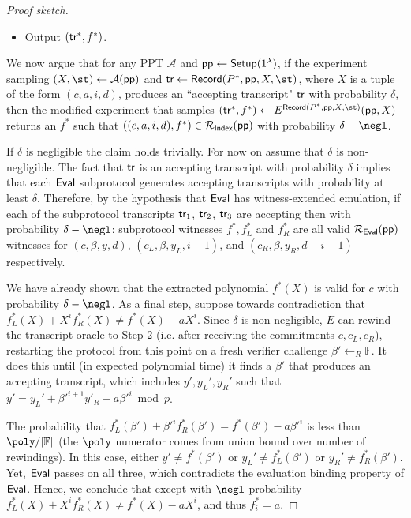 \documentclass{article}
\theoremstyle{definition}
\begin{document}
\begin{proof}[Proof sketch]
\begin{itemize}
\item Output $(\textsf{{tr}}^*, f^*)$.  
\end{itemize}

We now argue that for any PPT $\mathcal{A}$ and $\textsf{pp} \leftarrow \textsf{{Setup}}(1^\lambda)$, if the experiment sampling $(X, \st) \leftarrow \mathcal{A}(\params)$ and $\tr \leftarrow \pro{Record}(P^*, \params, X, \st)$, where $X$ is a tuple of the form $(c, a, i, d)$, produces an ``accepting transcript" $\textsf{{tr}}$ with probability $\delta$, then the modified experiment that samples $(\tr^*, f^*) \leftarrow E^{\textsf{Record}(P^*, \params, X, \st)}(\params, X)$ returns an $f^*$ such that $((c, a, i, d), f^*) \in \mathcal{R_\textsf{Index}}(\textsf{pp})$ with probability $\delta - \negl$. 

If $\delta$ is negligible the claim holds trivially. For now on assume that $\delta$ is non-negligible. 
The fact that $\textsf{{tr}}$ is an accepting transcript with probability $\delta$ implies that each $\textsf{{Eval}}$ subprotocol generates accepting transcripts with probability at least $\delta$. Therefore, by the hypothesis that $\textsf{{Eval}}$ has witness-extended emulation, if each of the subprotocol transcripts $\textsf{{tr}}_1$, $\textsf{{tr}}_2$, $\textsf{{tr}}_3$ are accepting then with probability $\delta - \negl$: subprotocol witnesses $f^*, f_L^*$ and $f_R^*$ are all valid $\mathcal{R_\textsf{Eval}}(\textsf{pp})$ witnesses for $(c, \beta, y, d)$, $(c_L, \beta, y_L, i-1)$, and $(c_R, \beta, y_R, d - i - 1)$ respectively. 

We have already shown that the extracted polynomial $f^*(X)$ is valid for $c$ with probability $\delta - \negl$. As a final step, suppose towards contradiction that $f_L^*(X) + X^i f_R^*(X) \neq f^*(X) - a X^i$. Since $\delta$ is non-negligible, $E$ can rewind the transcript oracle to Step 2 (i.e. after receiving the commitments $c, c_L, c_R$), restarting the protocol from this point on a fresh verifier challenge $\beta' \leftarrow_R \mathbb{F}$. It does this until (in expected polynomial time) it finds a $\beta'$ that produces an accepting transcript, which includes $y', y_L', y_R'$ such that $y' = y_L' + \beta'^{i+1} y'_R - a \beta'^i \bmod p$.

The probability that $f_L^*(\beta') + \beta'^i f_R^*(\beta') = f^*(\beta') - a \beta'^i$ is less than $\poly / |\mathbb{F}|$ (the $\poly$ numerator comes from union bound over number of rewindings). In this case, either $y' \neq f^*(\beta')$ or $y_L' \neq f^*_L(\beta')$ or $y_R' \neq f^*_R(\beta')$. Yet, $\textsf{{Eval}}$ passes on all three, which contradicts the evaluation binding property of $\textsf{{Eval}}$. Hence, we conclude that except with $\negl$ probability $f_L^*(X) + X^i f_R^*(X) \neq f^*(X) - a X^i$, and thus $f^*_i = a$. 

\end{proof}
\end{document}
